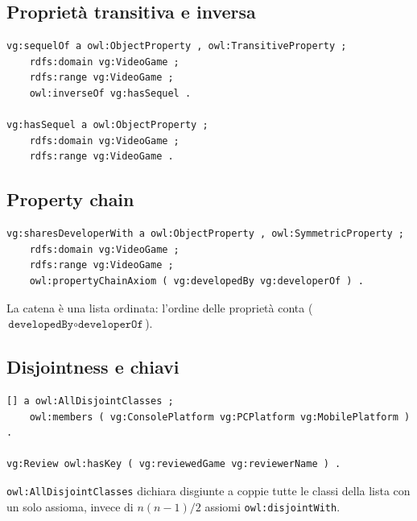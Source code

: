 \subsection*{Propriet\`a transitiva e inversa}

\begin{lstlisting}[style=turtle]
vg:sequelOf a owl:ObjectProperty , owl:TransitiveProperty ;
    rdfs:domain vg:VideoGame ;
    rdfs:range vg:VideoGame ;
    owl:inverseOf vg:hasSequel .

vg:hasSequel a owl:ObjectProperty ;
    rdfs:domain vg:VideoGame ;
    rdfs:range vg:VideoGame .
\end{lstlisting}

\subsection*{Property chain}

\begin{lstlisting}[style=turtle]
vg:sharesDeveloperWith a owl:ObjectProperty , owl:SymmetricProperty ;
    rdfs:domain vg:VideoGame ;
    rdfs:range vg:VideoGame ;
    owl:propertyChainAxiom ( vg:developedBy vg:developerOf ) .
\end{lstlisting}

La catena \`e una lista ordinata: l'ordine delle propriet\`a conta
($\texttt{developedBy} \circ \texttt{developerOf}$).

\subsection*{Disjointness e chiavi}

\begin{lstlisting}[style=turtle]
[] a owl:AllDisjointClasses ;
    owl:members ( vg:ConsolePlatform vg:PCPlatform vg:MobilePlatform ) .

vg:Review owl:hasKey ( vg:reviewedGame vg:reviewerName ) .
\end{lstlisting}

\texttt{owl:AllDisjointClasses} dichiara disgiunte a coppie tutte le classi della lista
con un solo assioma, invece di $n(n-1)/2$ assiomi \texttt{owl:disjointWith}.
